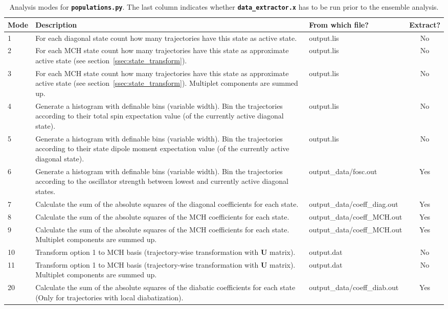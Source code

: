 \documentclass[a4paper,10pt,DIV=15,openany,twoside=false]{scrbook}
\newcommand{\ttt}[1]{\textbf{\texttt{#1}}}
\newcommand{\VEC}[1]{\ensuremath{\mathbf{#1}}}
\begin{document}
\begin{table}
  \centering
  \caption{Analysis modes for \ttt{populations.py}. The last column indicates whether \ttt{data\_extractor.x} has to be run prior to the ensemble analysis.}
  \label{tab:Populations_modes}
  \begin{tabular}{lp{8.5cm}>{\ttfamily}lc}
    \toprule
    Mode        &Description    &\rmfamily From which file?     &Extract?\\
    \midrule
    1   &For each diagonal state count how many trajectories have this state as active state. &output.lis  &No\\
    2   &For each MCH state count how many trajectories have this state as approximate active state (see section~\ref{ssec:state_transform}). &output.lis  &No\\
    3   &For each MCH state count how many trajectories have this state as approximate active state (see section~\ref{ssec:state_transform}). Multiplet components are summed up. &output.lis  &No\\
    4   &Generate a histogram with definable bins (variable width). Bin the trajectories according to their total spin expectation value (of the currently active diagonal state).   &output.lis &No\\
    5   &Generate a histogram with definable bins (variable width). Bin the trajectories according to their state dipole moment expectation value (of the currently active diagonal state).   &output.lis &No\\
    6   &Generate a histogram with definable bins (variable width). Bin the trajectories according to the oscillator strength between lowest and currently active diagonal states.        &output\_data/fosc.out  &Yes\\
    7   &Calculate the sum of the absolute squares of the diagonal coefficients for each state.       &output\_data/coeff\_diag.out&Yes\\
    8   &Calculate the sum of the absolute squares of the MCH coefficients for each state.       &output\_data/coeff\_MCH.out&Yes\\
    9   &Calculate the sum of the absolute squares of the MCH coefficients for each state. Multiplet components are summed up.       &output\_data/coeff\_MCH.out&Yes\\
   10   &Transform option 1 to MCH basis (trajectory-wise transformation with $\VEC{U}$ matrix).   &output.dat&No\\
   11   &Transform option 1 to MCH basis (trajectory-wise transformation with $\VEC{U}$ matrix). Multiplet components are summed up.   &output.dat&No\\
   20   &Calculate the sum of the absolute squares of the diabatic coefficients for each state (Only for trajectories with local diabatization).      &output\_data/coeff\_diab.out&Yes\\
    \bottomrule
  \end{tabular}
\end{table}
\end{document}
